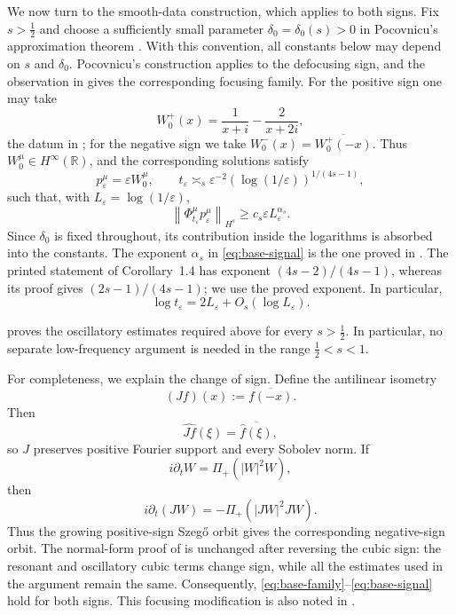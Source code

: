 \documentclass[10pt,a4paper]{amsart}
\numberwithin{equation}{section}
\newcommand{\R}{\mathbb R}
\newcommand{\eps}{\varepsilon}
\newcommand{\half}{\frac12}
\newcommand{\norm}[1]{\left\lVert #1\right\rVert}
\newcommand{\flow}[1]{\Phi^{#1}}
\begin{document}
We now turn to the smooth-data construction, which applies to both signs.  Fix
$s>\half$ and choose a sufficiently small parameter
$\delta_0=\delta_0(s)>0$ in Pocovnicu's approximation theorem
\cite{PocovnicuApprox}.  With this convention, all constants below may depend
on $s$ and $\delta_0$.  Pocovnicu's construction applies to the defocusing
sign, and the observation in \cite[footnote~1]{GLPR} gives the corresponding
focusing family.  For the positive sign one may take
\[
 W_0^+(x)=\frac1{x+i}-\frac2{x+2i},
\]
the datum in \cite[Proposition~1.3]{PocovnicuApprox}; for the negative sign we
take $W_0^-(x)=\overline{W_0^+(-x)}$.  Thus $W_0^\mu\in H^\infty(\R)$, and the
corresponding solutions satisfy
\begin{equation}\label{eq:base-family}
 p_\eps^\mu=\eps W_0^\mu,
 \qquad
 t_\eps\asymp_s\eps^{-2}(\log(1/\eps))^{1/(4s-1)},
\end{equation}
such that, with $L_\eps=\log(1/\eps)$,
\begin{equation}\label{eq:base-signal}
 \norm{\flow\mu_{t_\eps}p_\eps^\mu}_{H^s}
 \geq c_s\eps L_\eps^{\alpha_s}.
\end{equation}
Since $\delta_0$ is fixed throughout, its contribution inside the logarithms
is absorbed into the constants.  The exponent $\alpha_s$ in
\eqref{eq:base-signal} is the one proved in
\cite[proof of Corollary~1.4, especially (2.20)--(2.21)]{PocovnicuApprox}.
The printed statement of Corollary~1.4 has exponent
$(4s-2)/(4s-1)$, whereas its proof gives $(2s-1)/(4s-1)$; we use the proved
exponent.  In
particular,
\begin{equation}\label{eq:base-time-log}
 \log t_\eps=2L_\eps+O_s(\log L_\eps).
\end{equation}

\cite[Lemma~2.2]{PocovnicuApprox} proves the oscillatory estimates required
above for every $s>\half$.  In particular, no separate low-frequency
argument is needed in the range $\half<s<1$.

For completeness, we explain the change of sign.  Define the antilinear
isometry
\[
 (Jf)(x):=\overline{f(-x)}.
\]
Then
\[
 \widehat{Jf}(\xi)=\overline{\widehat f(\xi)},
\]
so $J$ preserves positive Fourier support and every Sobolev norm.  If
\[
 i\partial_tW=\Pi_+(|W|^2W),
\]
then
\[
 i\partial_t(JW)=-\Pi_+(|JW|^2JW).
\]
Thus the growing positive-sign Szeg\H{o} orbit gives the corresponding
negative-sign orbit.  The normal-form proof of
\cite[Theorem~1.2]{PocovnicuApprox} is unchanged after reversing the cubic
sign: the resonant and oscillatory cubic terms change sign, while all the
estimates used in the argument remain the same.  Consequently,
\eqref{eq:base-family}--\eqref{eq:base-signal} hold for both signs.  This
focusing modification is also noted in \cite[footnote~1]{GLPR}.
\end{document}
